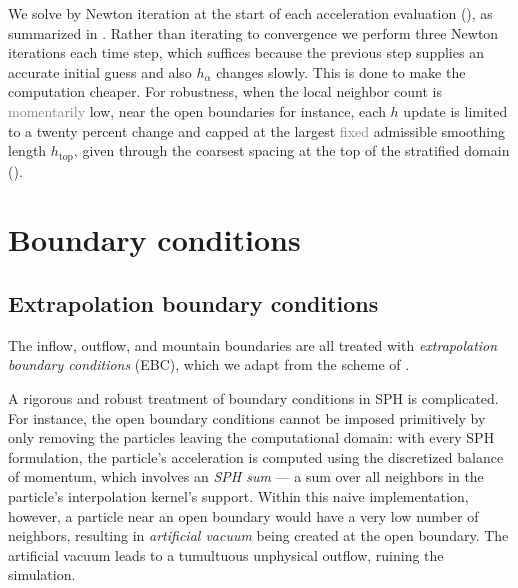 \documentclass[../main.tex]{subfiles}
\begin{document}
We solve  by Newton iteration at the start of each acceleration evaluation (), as summarized in . Rather than iterating to convergence we perform three Newton iterations each time step, which suffices because the previous step supplies an accurate initial guess and also $h_\alpha$ changes slowly. This is done to make the computation cheaper. For robustness, when the local neighbor count is \textcolor{gray}{momentarily} low, near the open boundaries for instance, each $h$ update is limited to a twenty percent change and capped at the largest \textcolor{gray}{fixed} admissible smoothing length $h_{\text{top}}$, given through the coarsest spacing at the top of the stratified domain ().

\section{Boundary conditions}
\label{sec:BCs}

\subsection{Extrapolation boundary conditions}
\label{sec:EBC}

The inflow, outflow, and mountain boundaries are all treated with \emph{extrapolation boundary conditions} (EBC), which we adapt from the scheme of \autocite{mahdizadehExtrapolationBoundaryConditions2025}. 

A rigorous and robust treatment of boundary conditions in SPH is complicated. For instance, the open boundary conditions cannot be imposed primitively by only removing the particles leaving the computational domain: with every SPH formulation, the particle's acceleration is computed using the discretized balance of momentum, which involves an \emph{SPH sum} --- a sum over all neighbors in the particle's interpolation kernel's support. Within this naive implementation, however, a particle near an open boundary would have a very low number of neighbors, resulting in \emph{artificial vacuum} being created at the open boundary. The artificial vacuum leads to a tumultuous unphysical outflow, ruining the simulation.
\end{document}
